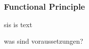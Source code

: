 \subsubsection{Functional Principle} \label{subsection:license-samsung-functional}
sis is text

was sind voraussetzungen? \newline
